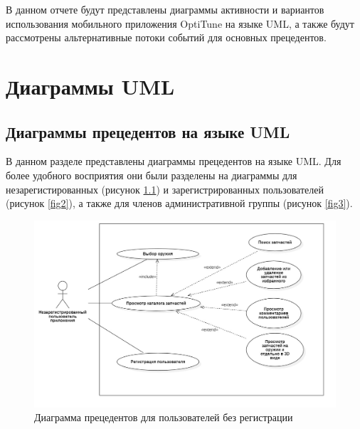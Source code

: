 \documentclass[14pt]{extreport}
\begin{document}
\pagestyle{empty} 


\pagestyle{plain}
\tableofcontents
 



\intro 

В данном отчете будут представлены диаграммы активности и вариантов
использования мобильного приложения OptiTune на языке UML, а также будут рассмотрены альтернативные потоки событий для основных прецедентов.


\chapter{Диаграммы UML\label{chapter1}}
\section{Диаграммы прецедентов на языке UML}

В данном разделе представлены диаграммы прецедентов на языке UML. Для более удобного восприятия они были разделены на диаграммы для незарегистированных (рисунок \ref{fig1}) и зарегистрированных пользователей (рисунок \ref{fig2}), а также для членов административной группы (рисунок \ref{fig3}).

\begin{figure}[H]
\centerline{\includegraphics[width=1\linewidth]{nereg}}
\caption{Диаграмма прецедентов для пользователей без регистрации}
\label{fig1}
\end{figure}
\end{document}
